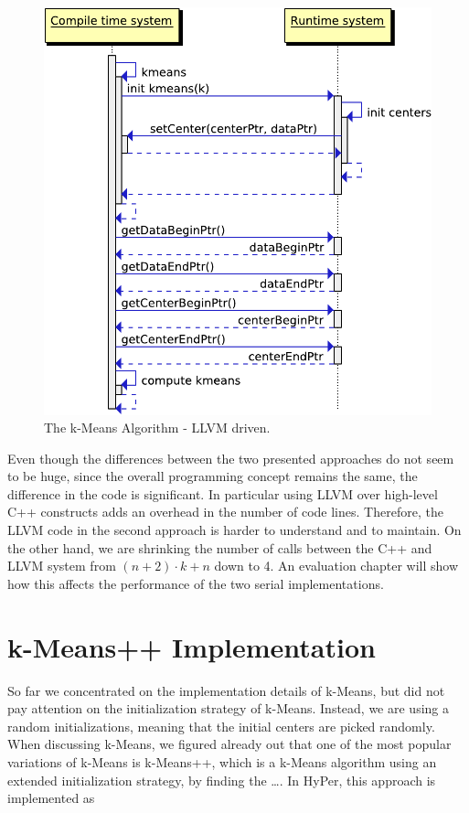 \begin{figure}[htsb]
  \centering
  \includegraphics[scale=0.4]{figures/llvm_driven}
  \caption[The k-Means Algorithm - LLVM driven]{The k-Means Algorithm - LLVM driven.}
  \label{fig:llvm_driven}
\end{figure}



Even though the differences between the two presented approaches do not seem to be huge, since the overall programming concept remains the same, the difference in the code is significant. In particular using LLVM over high-level C++ constructs adds an overhead in the number of code lines. Therefore, the LLVM code in the second approach is harder to understand and to maintain. On the other hand, we are shrinking the number of calls between the C++ and LLVM system from $(n + 2) \cdot k + n$ down to 4. An evaluation chapter will show how this affects the performance of the two serial implementations.


\section{k-Means++ Implementation}

So far we concentrated on the implementation details of k-Means, but did not pay attention on the initialization strategy of k-Means. Instead, we are using a random initializations, meaning that the initial centers are picked randomly. When discussing k-Means, we figured already out that one of the most popular variations of k-Means is k-Means++, which is a k-Means algorithm using an extended initialization strategy, by finding the ….
In HyPer, this approach is implemented as 

